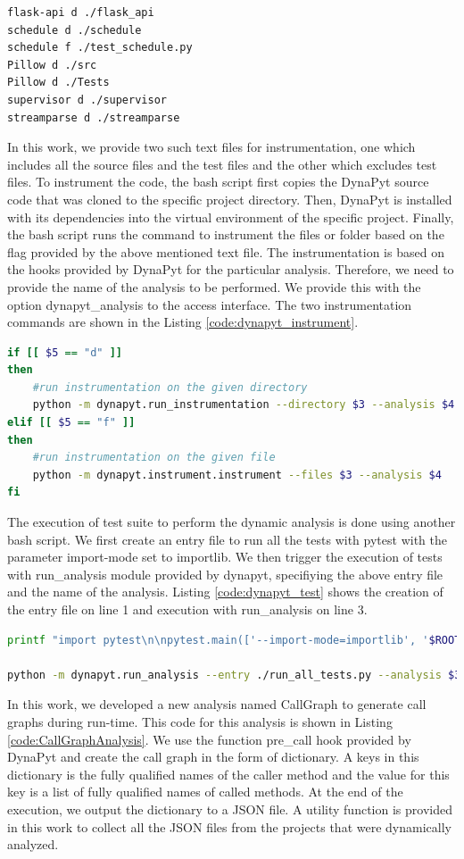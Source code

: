 \begin{lstlisting}[caption=dynapyt\_instrument\_all.txt,label=code:dynapyt_instrument.txt,language=Bash]
flask-api d ./flask_api
schedule d ./schedule
schedule f ./test_schedule.py
Pillow d ./src
Pillow d ./Tests
supervisor d ./supervisor
streamparse d ./streamparse
\end{lstlisting}

In this work, we provide two such text files for instrumentation, one which includes all the source files and the test files and the other which excludes test files.
To instrument the code, the bash script first copies the DynaPyt source code that was cloned to the specific project directory.
Then, DynaPyt is installed with its dependencies into the virtual environment of the specific project.
Finally, the bash script runs the command to instrument the files or folder based on the flag provided by the above mentioned text file.
The instrumentation is based on the hooks provided by DynaPyt for the particular analysis.
Therefore, we need to provide the name of the analysis to be performed.
We provide this with the option dynapyt\_analysis to the access interface.
The two instrumentation commands are shown in the Listing \ref{code:dynapyt_instrument}. 
\begin{lstlisting}[caption=DynaPyt Instrumentation,label=code:dynapyt_instrument,language=Bash]
if [[ $5 == "d" ]]
then
    #run instrumentation on the given directory
    python -m dynapyt.run_instrumentation --directory $3 --analysis $4
elif [[ $5 == "f" ]]
then
    #run instrumentation on the given file
    python -m dynapyt.instrument.instrument --files $3 --analysis $4
fi
\end{lstlisting}

The execution of test suite to perform the dynamic analysis is done using another bash script.
We first create an entry file to run all the tests with pytest with the parameter import-mode set to importlib.
We then trigger the execution of tests with run\_analysis module provided by dynapyt, specifiying the above entry file and the name of the analysis.
Listing \ref{code:dynapyt_test} shows the creation of the entry file on line 1 and execution with run\_analysis on line 3.
\begin{lstlisting}[caption=DynaPyt Test Suite Execution,label=code:dynapyt_test,language=Bash]
printf "import pytest\n\npytest.main(['--import-mode=importlib', '$ROOT_DIR/temp/project$2/$4'])\n" > run_all_tests.py

python -m dynapyt.run_analysis --entry ./run_all_tests.py --analysis $3
\end{lstlisting}

In this work, we developed a new analysis named CallGraph to generate call graphs during run-time.
This code for this analysis is shown in Listing \ref{code:CallGraphAnalysis}.
We use the function pre\_call hook provided by DynaPyt and create the call graph in the form of dictionary.
A keys in this dictionary is the fully qualified names of the caller method and the value for this key is a list of fully qualified names of called methods.
At the end of the execution, we output the dictionary to a JSON file.
A utility function is provided in this work to collect all the JSON files from the projects that were dynamically analyzed.